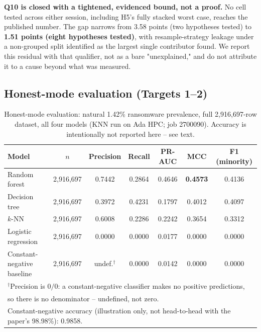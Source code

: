 \documentclass[conference]{IEEEtran}
\begin{document}
\textbf{Q10 is closed with a tightened, evidenced bound, not a proof.} No cell tested across
either session, including H5's fully stacked worst case, reaches the published number. The gap
narrows from 3.58 points (two hypotheses tested) to \textbf{1.51 points (eight hypotheses
tested)}, with resample-strategy leakage under a non-grouped split identified as the largest
single contributor found. We report this residual with that qualifier, not as a bare
"unexplained," and do not attribute it to a cause beyond what was measured.

\subsection{Honest-mode evaluation (Targets 1--2)}
\label{sec:5b}

\begin{table}[t]
\centering
\caption{Honest-mode evaluation: natural 1.42\% ransomware prevalence, full 2{,}916{,}697-row
dataset, all four models (KNN run on Ada HPC; job 2700090). Accuracy is intentionally not
reported here -- see text.}
\label{tab:honest}
\footnotesize
\begin{tabular}{lcccccc}
\hline
\textbf{Model} & \textbf{$n$} & \textbf{Precision} & \textbf{Recall} & \textbf{PR-AUC} & \textbf{MCC} & \textbf{F1 (minority)} \\
\hline
Random forest & 2{,}916{,}697 & 0.7442 & 0.2864 & 0.4646 & \textbf{0.4573} & 0.4136 \\
Decision tree & 2{,}916{,}697 & 0.3972 & 0.4231 & 0.1797 & 0.4012 & 0.4097 \\
$k$-NN & 2{,}916{,}697 & 0.6008 & 0.2286 & 0.2242 & 0.3654 & 0.3312 \\
Logistic regression & 2{,}916{,}697 & 0.0000 & 0.0000 & 0.0177 & 0.0000 & 0.0000 \\
\hline
Constant-negative baseline & 2{,}916{,}697 & undef.$^{\dagger}$ & 0.0000 & 0.0142 & 0.0000 & 0.0000 \\
\hline
\multicolumn{7}{l}{\footnotesize $^{\dagger}$Precision is $0/0$: a constant-negative classifier makes no positive predictions,} \\
\multicolumn{7}{l}{\footnotesize \phantom{$^{\dagger}$}so there is no denominator -- undefined, not zero.} \\
\multicolumn{7}{l}{\footnotesize Constant-negative accuracy (illustration only, not head-to-head with the paper's 98.98\%): 0.9858.} \\
\end{tabular}
\end{table}
\end{document}
